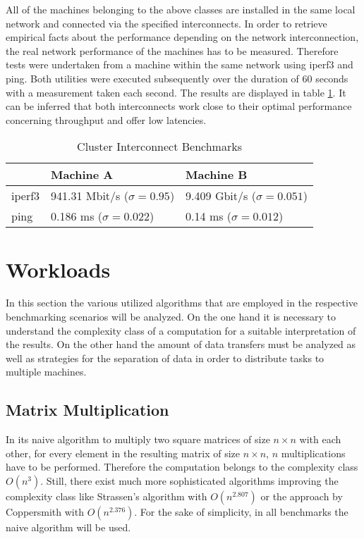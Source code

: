 All of the machines belonging to the above classes are installed in the same local network and connected via the specified interconnects. In order to retrieve empirical facts about the performance depending on the network interconnection, the real network performance of the machines has to be measured. Therefore tests were undertaken from a machine within the same network using iperf3 and ping. Both utilities were executed subsequently over the duration of 60 seconds with a measurement taken each second. The results are displayed in table \ref{table:cluster_interconnect_benchmarks}. It can be inferred that both interconnects work close to their optimal performance concerning throughput and offer low latencies.

\begin{table}[!htb]
	\centering
	\begin{adjustbox}{width=0.5\textwidth}
		\small
		\begin{tabular}{l | l | l}
			~                     & Machine A                 			& Machine B                  \\
			\hline
			iperf3                & 941.31 Mbit/s ($\sigma = 0.95$) 	& 9.409 Gbit/s ($\sigma = 0.051$) \\
			ping                  & 0.186 ms ($\sigma = 0.022$)  		& 0.14 ms ($\sigma = 0.012$)  \\
		\end{tabular}
	\end{adjustbox}
	
	\caption{Cluster Interconnect Benchmarks}
	\label{table:cluster_interconnect_benchmarks}
\end{table}

\section{Workloads}
\label{workload_explanation}
In this section the various utilized algorithms that are employed in the respective benchmarking scenarios will be analyzed. On the one hand it is necessary to understand the complexity class of a computation for a suitable interpretation of the results. On the other hand the amount of data transfers must be analyzed as well as strategies for the separation of data in order to distribute tasks to multiple machines.

\subsection*{Matrix Multiplication}
\label{matrix_multiplication_workload}
In its naive algorithm to multiply two square matrices of size $n\times n$ with each other, for every element in the resulting matrix of size $n\times n$, $n$ multiplications have to be performed. Therefore the computation belongs to the complexity class $O(n^3)$. Still, there exist much more sophisticated algorithms improving the complexity class like Strassen's algorithm with $O(n^{2.807})$\cite{strassen} or the approach by Coppersmith with $O(n^{2.376})$\cite{coppersmith}. For the sake of simplicity, in all benchmarks the naive algorithm will be used.

